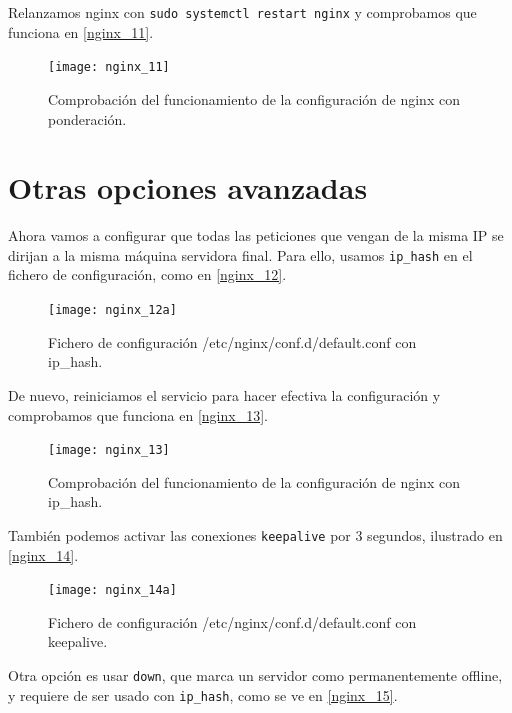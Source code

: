 Relanzamos nginx con \verb|sudo systemctl restart nginx| y comprobamos que funciona en \eqref{nginx_11}.

\begin{figure}[h!]
\begin{center}
\caption{Comprobación del funcionamiento de la configuración de nginx con ponderación.}
\label{nginx_11}
\texttt{[image: nginx\_11]}
\end{center}
\end{figure}

\section{Otras opciones avanzadas}

Ahora vamos a configurar que todas las peticiones que vengan de la misma IP se dirijan a la misma máquina servidora final. Para ello, usamos \verb|ip_hash| en el fichero de configuración, como en \eqref{nginx_12}.

\begin{figure}[h!]
\begin{center}
\caption{Fichero de configuración /etc/nginx/conf.d/default.conf con ip\_hash.}
\label{nginx_12}
\texttt{[image: nginx\_12a]}
\end{center}
\end{figure}

De nuevo, reiniciamos el servicio para hacer efectiva la configuración y comprobamos que funciona en \eqref{nginx_13}.

\begin{figure}[h!]
\begin{center}
\caption{Comprobación del funcionamiento de la configuración de nginx con ip\_hash.}
\label{nginx_13}
\texttt{[image: nginx\_13]}
\end{center}
\end{figure}

También podemos activar las conexiones \verb|keepalive| por 3 segundos, ilustrado en \eqref{nginx_14}.

\begin{figure}[h!]
\begin{center}
\caption{Fichero de configuración /etc/nginx/conf.d/default.conf con keepalive.}
\label{nginx_14}
\texttt{[image: nginx\_14a]}
\end{center}
\end{figure}

Otra opción es usar \verb|down|, que marca un servidor como permanentemente offline, y requiere de ser usado con \verb|ip_hash|, como se ve en \eqref{nginx_15}.


